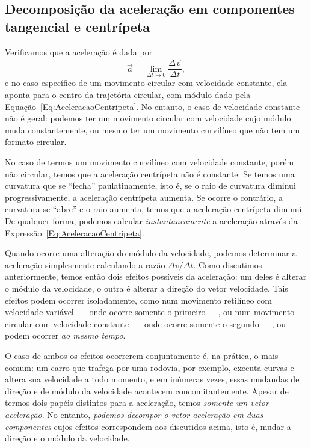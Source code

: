 \subsection{Decomposição da aceleração em componentes tangencial e centrípeta}

Verificamos que a aceleração é dada por
\begin{displaymath}
  \vec{a} = \lim_{\Delta t \to 0} \frac{\Delta \vec{v}}{\Delta t},
\end{displaymath}
%
e no caso específico de um movimento circular com velocidade constante, ela aponta para o centro da trajetória circular, com módulo dado pela Equação~\eqref{Eq:AceleracaoCentripeta}. No entanto, o caso de velocidade constante não é geral: podemos ter um movimento circular com velocidade cujo módulo muda constantemente, ou mesmo ter um movimento curvilíneo que não tem um formato circular.

No caso de termos um movimento curvilíneo com velocidade constante, porém não circular, temos que a aceleração centrípeta não é constante. Se temos uma curvatura que se ``fecha'' paulatinamente, isto é, se o raio de curvatura diminui progressivamente, a aceleração centrípeta aumenta. Se ocorre o contrário, a curvatura se ``abre'' e o raio aumenta, temos que a aceleração centrípeta diminui. De qualquer forma, podemos calcular \emph{instantaneamente} a aceleração através da Expressão~\ref{Eq:AceleracaoCentripeta}.

Quando ocorre uma alteração do módulo da velocidade, podemos determinar a aceleração simplesmente calculando a razão $\Delta v/\Delta t$. Como discutimos anteriormente, temos então dois efeitos possíveis da aceleração: um deles é alterar o módulo da velocidade, o outra é alterar a direção do vetor velocidade. Tais efeitos podem ocorrer isoladamente, como num movimento retilíneo com velocidade variável ---~onde ocorre somente o primeiro~---, ou num movimento circular com velocidade constante ---~onde ocorre somente o segundo~---, ou podem ocorrer \emph{ao mesmo tempo}.

O caso de ambos os efeitos ocorrerem conjuntamente é, na prática, o mais comum: um carro que trafega por uma rodovia, por exemplo, executa curvas e altera sua velocidade a todo momento, e em inúmeras vezes, essas mudandas de direção e de módulo da velocidade acontecem concomitantemente. Apesar de termos dois papéis distintos para a aceleração, temos \emph{somente um vetor aceleração}. No entanto, \emph{podemos decompor o vetor aceleração em duas componentes} cujos efeitos correspondem aos discutidos acima, isto é, mudar a direção e o módulo da velocidade. 

